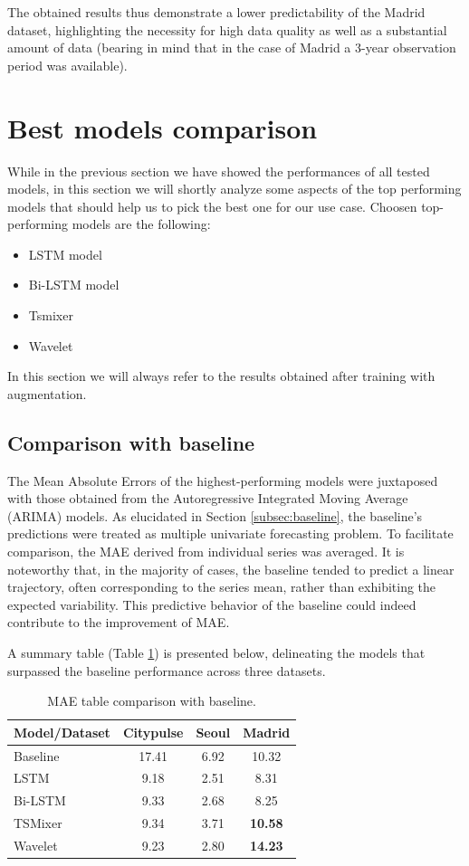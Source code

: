 The obtained results thus demonstrate a lower predictability of the Madrid dataset, highlighting the necessity for high data quality as well as a substantial amount of data (bearing in mind that in the case of Madrid a 3-year observation period was available).

\section{Best models comparison}

While in the previous section we have showed the performances of all tested models, in this section we will shortly analyze some aspects of the top performing models that should help us to pick the best one for our use case. Choosen top-performing models are the following:
\begin{itemize}
    \item LSTM model
    \item Bi-LSTM model
    \item Tsmixer
    \item Wavelet
\end{itemize}

In this section we will always refer to the results obtained after training with augmentation.

\subsection{Comparison with baseline}
\label{subsec:baseline_comparison}
The Mean Absolute Errors of the highest-performing models were juxtaposed with those obtained from the Autoregressive Integrated Moving Average (ARIMA) models. As elucidated in Section \ref{subsec:baseline}, the baseline's predictions were treated as multiple univariate forecasting problem. To facilitate comparison, the MAE derived from individual series was averaged. It is noteworthy that, in the majority of cases, the baseline tended to predict a linear trajectory, often corresponding to the series mean, rather than exhibiting the expected variability. This predictive behavior of the baseline could indeed contribute to the improvement of MAE.

A summary table (Table \ref{tab:baseline-comparison}) is presented below, delineating the models that surpassed the baseline performance across three datasets.

\begin{table}[]
\centering
\begin{tabular}{lccc}
\toprule
\textbf{Model/Dataset} & \textbf{Citypulse} & \textbf{Seoul} & \textbf{Madrid} \\ 
\midrule
Baseline & 17.41 & 6.92 & 10.32 \\
LSTM & 9.18 & 2.51 & 8.31 \\
Bi-LSTM & 9.33 & 2.68 & 8.25 \\
TSMixer & 9.34 & 3.71 & \textbf{10.58} \\
Wavelet & 9.23 & 2.80 & \textbf{14.23} \\
\bottomrule
\end{tabular}
\caption{MAE table comparison with baseline.}
\label{tab:baseline-comparison}
\end{table}

